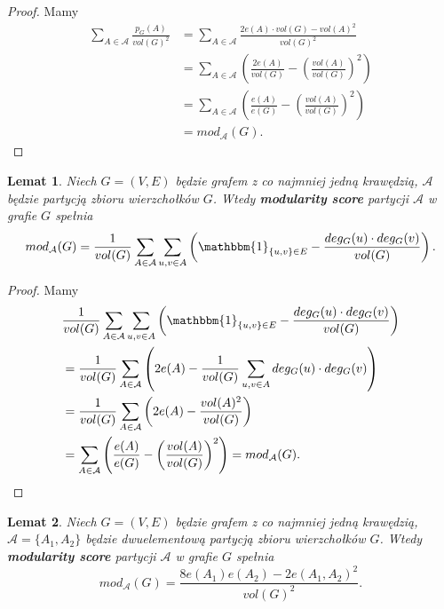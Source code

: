 \documentclass[letterpaper,12pt]{article}
\newtheorem{lemma}{Lemat}
\begin{document}
\begin{proof}
  Mamy
  \begin{align*}
    \sum_{A \in \mathcal{A}} \frac{p_G(A)}{vol(G)^2} & = \sum_{A \in \mathcal{A}} \frac{2e(A) \cdot vol(G) - {vol(A)}^2}{vol(G)^2}                           \\
                                                     & = \sum_{A \in \mathcal{A}} \left(\frac{2e(A)}{vol(G)} - {\left(\frac{vol(A)}{vol(G)}\right)}^2\right) \\
                                                     & = \sum_{A \in \mathcal{A}} \left(\frac{e(A)}{e(G)} - {\left(\frac{vol(A)}{vol(G)}\right)}^2\right)    \\
                                                     & = mod_{\mathcal{A}}(G).
  \end{align*}
\end{proof}

\begin{lemma}
  \label{score_deg}
  Niech \(G = (V, E)\) będzie grafem z co najmniej jedną krawędzią, \(\mathcal{A}\) będzie partycją zbioru wierzchołków \(G\). Wtedy \textbf{modularity score} partycji \(\mathcal{A}\) w grafie \(G\) spełnia
  \[mod_{\mathcal{A}}(G) = \frac{1}{vol(G)}\sum_{A \in \mathcal{A}} \sum_{u,v \in A} \left( \mathbbm{1}_{\{u,v\} \in E} - \frac{deg_G(u) \cdot deg_G(v)}{vol(G)}\right).\]
\end{lemma}

\begin{proof}
  Mamy
  \begin{align*}
     & \frac{1}{vol(G)}\sum_{A \in \mathcal{A}} \sum_{u,v \in A}
    \left( \mathbbm{1}_{\{u,v\} \in E} - \frac{deg_G(u) \cdot deg_G(v)}{vol(G)}\right) \\
     & = \frac{1}{vol(G)}\sum_{A \in \mathcal{A}}
    \left( 2e(A) - \frac{1}{vol(G)} \sum_{u,v \in A} deg_G(u) \cdot deg_G(v)\right)    \\
     & = \frac{1}{vol(G)}\sum_{A \in \mathcal{A}}
    \left( 2e(A) - \frac{vol(A)^2}{vol(G)}\right)                                      \\
     & = \sum_{A \in \mathcal{A}}
    \left(\frac{e(A)}{e(G)} - {\left(\frac{vol(A)}{vol(G)}\right)}^2\right) = mod_{\mathcal{A}}(G).
  \end{align*}
\end{proof}

\begin{lemma}
  \label{2partition}
  Niech \(G = (V, E)\) będzie grafem z co najmniej jedną krawędzią, \(\mathcal{A}=\{A_1,A_2\}\) będzie dwuelementową partycją zbioru wierzchołków \(G\). Wtedy \textbf{modularity score} partycji \(\mathcal{A}\) w grafie \(G\) spełnia
  \[mod_{\mathcal{A}}(G) = \frac{8e(A_1)e(A_2)-2e(A_1,A_2)^2}{vol(G)^2}.\]
\end{lemma}
\end{document}
